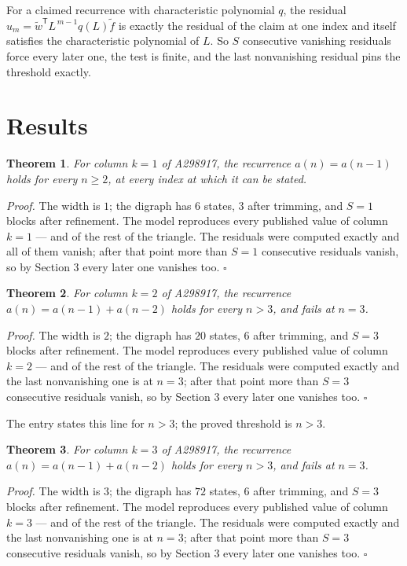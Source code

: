 \documentclass[11pt]{article}
\newtheorem{theorem}{Theorem}
\theoremstyle{definition}
\begin{document}
For a claimed recurrence with characteristic polynomial $q$, the residual $u_m = \tilde w^{\mathsf T}L^{\,m-1}q(L)\tilde f$ is exactly the residual of the claim at one index and itself satisfies the characteristic polynomial of $L$. So $S$ consecutive vanishing residuals force every later one, the test is finite, and the last nonvanishing residual pins the threshold exactly.

\section{Results}

\begin{theorem} For column $k = 1$ of A298917, the recurrence $a(n) = a(n-1)$ holds for every $n \ge 2$, at every index at which it can be stated.\end{theorem}

{\itshape Proof.} The width is $1$; the digraph has $6$ states, $3$ after trimming, and $S = 1$ blocks after refinement. The model reproduces every published value of column $k = 1$ --- and of the rest of the triangle. The residuals were computed exactly and all of them vanish; after that point more than $S = 1$ consecutive residuals vanish, so by Section 3 every later one vanishes too. $\square$

\begin{theorem} For column $k = 2$ of A298917, the recurrence $a(n) = a(n-1) + a(n-2)$ holds for every $n > 3$, and fails at $n = 3$.\end{theorem}

{\itshape Proof.} The width is $2$; the digraph has $20$ states, $6$ after trimming, and $S = 3$ blocks after refinement. The model reproduces every published value of column $k = 2$ --- and of the rest of the triangle. The residuals were computed exactly and the last nonvanishing one is at $n = 3$; after that point more than $S = 3$ consecutive residuals vanish, so by Section 3 every later one vanishes too. $\square$

The entry states this line for $n > 3$; the proved threshold is $n > 3$.

\begin{theorem} For column $k = 3$ of A298917, the recurrence $a(n) = a(n-1) + a(n-2)$ holds for every $n > 3$, and fails at $n = 3$.\end{theorem}

{\itshape Proof.} The width is $3$; the digraph has $72$ states, $6$ after trimming, and $S = 3$ blocks after refinement. The model reproduces every published value of column $k = 3$ --- and of the rest of the triangle. The residuals were computed exactly and the last nonvanishing one is at $n = 3$; after that point more than $S = 3$ consecutive residuals vanish, so by Section 3 every later one vanishes too. $\square$
\end{document}
